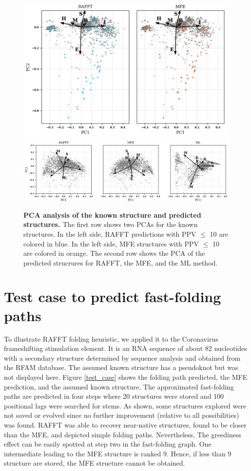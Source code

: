 \documentclass[a4paper,12pt]{article}
\begin{document}
\begin{figure}[!ht]
  \centering
  \includegraphics[scale=0.6]{img/pca_known.png}\\
  \includegraphics[scale=0.7]{img/pca_predicted.png} 
  \caption{\textbf{PCA analysis of the known structure and predicted
      structures. \label{pca_struct}} The first row shows two PCAs for the known
    structures. In the left side, RAFFT predictions with PPV $\leq$ 10 are
    colored in blue. In the left side, MFE structures with PPV $\leq$ 10 are
    colored in orange. The second row shows the PCA of the predicted strucrures
    for RAFFT, the MFE, and the ML method.}
\end{figure}

\section*{Test case to predict fast-folding paths}
\label{sec:org66c1938}
To illustrate RAFFT folding heuristic, we applied it to the Coronavirus
frameshifting stimulation element. It is an RNA sequence of about 82 nucleotides
with a secondary structure determined by sequence analysis and obtained from the
RFAM database. The assumed known structure has a pseudoknot but was not
displayed here. Figure \ref{test_case} shows the folding path predicted, the MFE
prediction, and the assumed known structure. The approximated fast-folding paths
are predicted in four steps where 20 structures were stored and 100 positional
lags were searched for stems. As shown, some structures explored were not saved
or evolved since no further improvement (relative to all possibilities) was
found. RAFFT was able to recover near-native structures, found to be closer than
the MFE, and depicted simple folding paths. Nevertheless, The greediness effect
can be easily spotted at step two in the fast-folding graph. One intermediate
leading to the MFE structure is ranked 9. Hence, if less than 9 structure are
stored, the MFE structure cannot be obtained.
\end{document}
